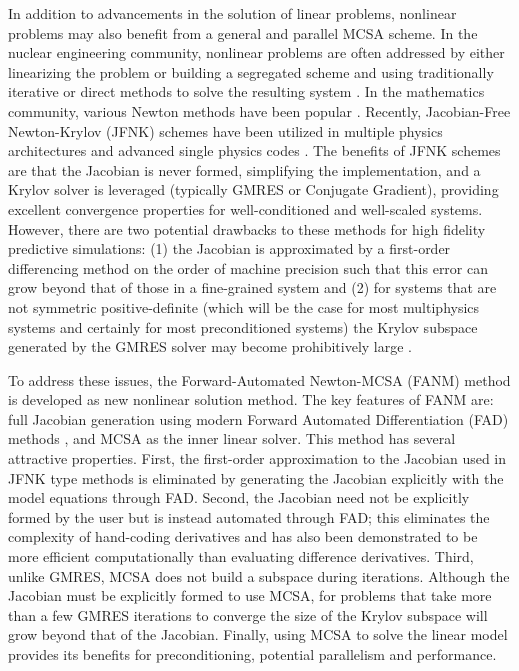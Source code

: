 In addition to advancements in the solution of linear problems,
nonlinear problems may also benefit from a general and parallel MCSA
scheme. In the nuclear engineering community, nonlinear problems are
often addressed by either linearizing the problem or building a
segregated scheme and using traditionally iterative or direct methods
to solve the resulting system \cite{pletcher_computational_1997}. In
the mathematics community, various Newton methods have been popular
\cite{kelley_iterative_1995}. Recently, Jacobian-Free Newton-Krylov
(JFNK) schemes \cite{knoll_jacobian-free_2004} have been utilized in
multiple physics architectures and advanced single physics codes
\cite{gaston_parallel_2009}. The benefits of JFNK schemes are that the
Jacobian is never formed, simplifying the implementation, and a Krylov
solver is leveraged (typically GMRES or Conjugate Gradient), providing
excellent convergence properties for well-conditioned and well-scaled
systems. However, there are two potential drawbacks to these methods
for high fidelity predictive simulations: (1) the Jacobian is
approximated by a first-order differencing method on the order of
machine precision such that this error can grow beyond that of those
in a fine-grained system \cite{kelley_iterative_1995} and (2) for
systems that are not symmetric positive-definite (which will be the
case for most multiphysics systems and certainly for most
preconditioned systems) the Krylov subspace generated by the GMRES
solver may become prohibitively large
\cite{knoll_newton-krylov_1995}. 

To address these issues, the Forward-Automated Newton-MCSA (FANM)
method is developed as new nonlinear solution method. The key features
of FANM are: full Jacobian generation using modern Forward Automated
Differentiation (FAD) methods \cite{bartlett_automatic_2006}, and MCSA
as the inner linear solver. This method has several attractive
properties. First, the first-order approximation to the Jacobian used
in JFNK type methods is eliminated by generating the Jacobian
explicitly with the model equations through FAD. Second, the Jacobian
need not be explicitly formed by the user but is instead automated
through FAD; this eliminates the complexity of hand-coding derivatives
and has also been demonstrated to be more efficient computationally
than evaluating difference derivatives. Third, unlike GMRES, MCSA does
not build a subspace during iterations. Although the Jacobian must be
explicitly formed to use MCSA, for problems that take more than a few
GMRES iterations to converge the size of the Krylov subspace will grow
beyond that of the Jacobian. Finally, using MCSA to solve the linear
model provides its benefits for preconditioning, potential parallelism
and performance.


